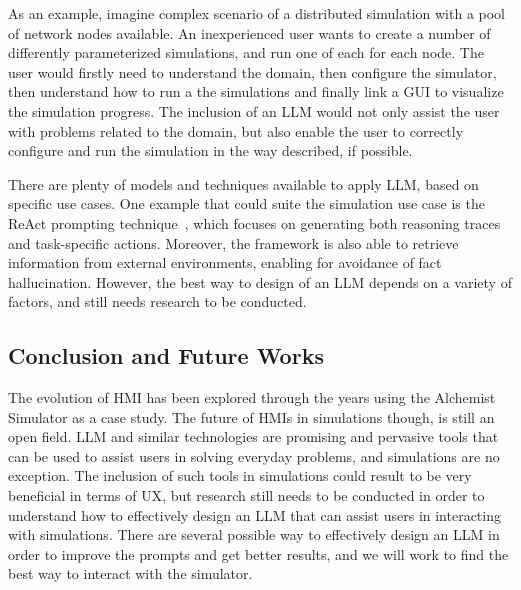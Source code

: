 \documentclass[conference]{IEEEtran}
\begin{document}
As an example,
imagine complex scenario of a distributed simulation with a pool of network nodes available.
%
An inexperienced user wants to create a number of differently parameterized simulations,
and run one of each for each node.
%
The user would firstly need to understand the domain,
then configure the simulator,
then understand how to run a the simulations and finally link a \ac{GUI} to visualize the simulation progress.
%
The inclusion of an \ac{LLM} would not only assist the user with problems related to the domain,
but also enable the user to correctly configure and run the simulation in the way described,
if possible.
%

There are plenty of models and techniques available to apply \ac{LLM},
based on specific use cases.
%
One example that could suite the simulation use case is the ReAct prompting technique~\cite{DBLP:conf/iclr/YaoZYDSN023},
which focuses on generating both reasoning traces and task-specific actions.
%
Moreover,
the framework is also able to retrieve information from external environments,
enabling for avoidance of fact hallucination.
%
However,
the best way to design of an \ac{LLM} depends on a variety of factors,
and still needs research to be conducted.

\subsection{Conclusion and Future Works}
%
The evolution of HMI has been explored through the years using the Alchemist Simulator as a case study.
%
The future of \acp{HMI} in simulations though, is still an open field.
%
\ac{LLM} and similar technologies are promising and pervasive tools that can be used to assist users in solving everyday problems,
and simulations are no exception.
%
The inclusion of such tools in simulations could result to be very beneficial in terms of \ac{UX},
but research still needs to be conducted in order to understand how to effectively design an \ac{LLM} that can assist users in interacting with simulations.
%
There are several possible way to effectively design an \ac{LLM} in order to improve the prompts and get better results,
and we will work to find the best way to interact with the simulator.



\vspace{12pt}
\end{document}
